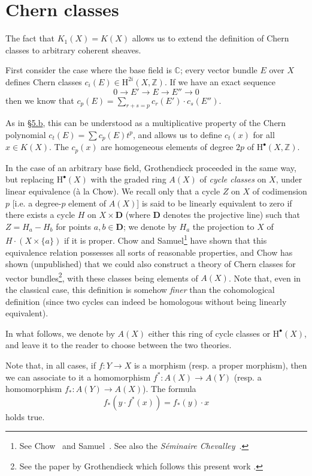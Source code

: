 \documentclass{article}
\theoremstyle{plain}
\theoremstyle{definition}
\newcommand{\HH}{\mathrm{H}}
\newcommand{\oldpage}[1]{\marginpar{\footnotesize$\Big\vert$ \textit{p.~#1}}}
\begin{document}
\section{Chern classes}
\label{section6}

The fact that $K_1(X)=K(X)$ allows us to extend the definition of Chern classes to arbitrary coherent sheaves.

First consider the case where the base field is $\mathbb{C}$;
every vector bundle $E$ over $X$ defines Chern classes $c_i(E)\in\HH^{2i}(X,\mathbb{Z})$.
If we have an exact sequence
\[
  0\to E'\to E\to E''\to0
\]
then we know that $c_p(E)=\sum_{r+s=p}c_r(E')\cdot c_s(E'')$.

As in \hyperref[subsection5b]{\S5.b}, this can be understood as a multiplicative property of the Chern polynomial $c_t(E)=\sum c_p(E)t^p$, and allows us to define $c_t(x)$ for all $x\in K(X)$.
The $c_p(x)$ are homogeneous elements of degree $2p$ of $\HH^\bullet(X,\mathbb{Z})$.

In the case of an arbitrary base field, Grothendieck proceeded in the same way, but replacing $\HH^\bullet(X)$ with the graded ring $A(X)$ of \emph{cycle classes} on $X$, under linear equivalence (\`{a} la Chow).
We recall only that a cycle $Z$ on $X$ of codimension $p$ [i.e. a degree-$p$ element of $A(X)$] is said to be linearly equivalent to zero if there exists a cycle $H$ on $X\times\mathbf{D}$ (where $\mathbf{D}$ denotes the projective line) such that $Z=H_a-H_b$ for points $a,b\in\mathbf{D}$;
we denote by $H_a$ the projection to $X$ of $H\cdot(X\times\{a\})$ if it is proper.
Chow and Samuel\footnote{See Chow~\cite{5} and Samuel~\cite{10}. See also the \emph{S\'{e}minaire Chevalley}~\cite{11}.} have shown that
\oldpage{112}
this equivalence relation possesses all sorts of reasonable properties, and Chow has shown (unpublished) that we could also construct a theory of Chern classes for vector bundles\footnote{See the paper by Grothendieck which follows this present work \cite{8}.}, with these classes being elements of $A(X)$.
Note that, even in the classical case, this definition is somehow \emph{finer} than the cohomological definition (since two cycles can indeed be homologous without being linearly equivalent).

In what follows, we denote by $A(X)$ either this ring of cycle classes or $\HH^\bullet(X)$, and leave it to the reader to choose between the two theories.

Note that, in all cases, if $f\colon Y\to X$ is a morphism (resp. a proper morphism), then we can associate to it a homomorphism $f^*\colon A(X)\to A(Y)$ (resp. a homomorphism $f_*\colon A(Y)\to A(X)$).
The formula
\[
  f_*(y\cdot f^*(x)) = f_*(y)\cdot x
\]
holds true.
\end{document}
